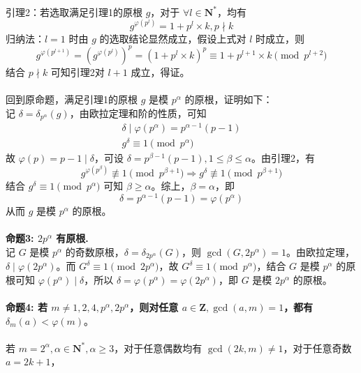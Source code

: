 \documentclass[12pt,a4paper]{article}
\begin{document}
\\引理2：若选取满足引理1的原根 $g$，对于 $\forall l\in\mathbf{N^*}$，均有 
\begin{equation*}
	g^{\varphi(p^l)}=1+p^l\times k,p\nmid k
\end{equation*}
归纳法：$l=1$ 时由 $g$ 的选取结论显然成立，假设上式对 $l$ 时成立，则 
\begin{equation*}
	g^{\varphi(p^{l+1})}=(g^{\varphi(p^l)})^p=(1+p^l\times k)^p\equiv1+p^{l+1}\times k\pmod{p^{l+2}}
\end{equation*}
结合 $p\nmid k$ 可知引理2对 $l+1$ 成立，得证。\\\\
回到原命题，满足引理1的原根 $g$ 是模 $p^\alpha$ 的原根，证明如下：\\
记 $\delta=\delta_{p^\alpha}(g)$，由欧拉定理和阶的性质，可知 
\begin{align*}
	\delta\mid\varphi(p^\alpha)=p^{\alpha-1}(p-1)\\ g^\delta\equiv1\pmod{p^\alpha}
\end{align*}
故 $\varphi(p)=p-1\mid \delta$，可设 $\delta=p^{\beta-1}(p-1),1\le\beta\le \alpha$。由引理2，有 \begin{equation*}
	g^{\varphi(p^{\beta})}\not\equiv 1\pmod {p^{\beta+1}}\Rightarrow g^{\delta}\not\equiv 1\pmod {p^{\beta+1}}
\end{equation*}结合 $g^\delta\equiv1\pmod{p^\alpha}$ 可知 $\beta\ge \alpha$。综上，$\beta=\alpha$，即 
\begin{equation*}
	\delta=p^{\alpha-1}(p-1)=\varphi(p^\alpha)
\end{equation*}从而 $g$ 是模 $p^\alpha$ 的原根。\\
\\\textbf{命题3: $2p^\alpha$ 有原根.}\\
记 $G$ 是模 $p^\alpha$ 的奇数原根，$\delta=\delta_{2p^\alpha}(G)$，则 $\gcd(G, 2p^\alpha)=1$。由欧拉定理，$\delta\mid \varphi(2p^\alpha)$。而 $G^\delta\equiv1\pmod{2p^\alpha}$，故 $G^\delta\equiv1\pmod{p^\alpha}$，结合 $G$ 是模 $p^\alpha$ 的原根可知 $\varphi(p^\alpha)\mid \delta$，所以 $\delta=\varphi(p^\alpha)=\varphi(2p^\alpha)$，即 $G$ 是模 $2p^\alpha$ 的原根。
\\
\\\textbf{命题4: 若 $m\neq 1,2,4,p^\alpha,2p^\alpha$，则对任意 $a\in\mathbf{Z},\gcd(a,m)=1$，都有 $\delta_m(a)<\varphi(m)$}。\\\\
若 $m=2^\alpha,\alpha\in\mathbf{N^*},\alpha\ge3$，对于任意偶数均有 $\gcd(2k,m)\ne1$，对于任意奇数 $a=2k+1$，
\end{document}
